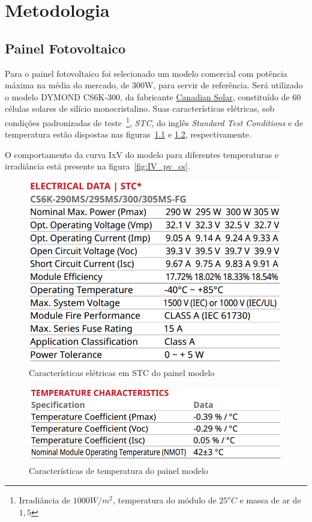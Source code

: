 \documentclass[
	12pt,				%
	openright,			%
	onseside,
	a4paper,			%
	english,			%
	french,				%
	spanish,			%
	brazil,				%
	]{abntex2}
\begin{document}

\chapter{Metodologia}

\section{Painel Fotovoltaico}

Para o painel fotovoltaico foi selecionado um modelo comercial com potência máxima na média do mercado, de 300W, para servir de referência. Será utilizado o modelo DYMOND CS6K-300, da fabricante \href{https://www.canadiansolar.com/en}{Canadian Solar}, constituído de 60 células solares de silício monocristalino. Suas características elétricas, sob condições padronizadas de teste~\footnote{Irradiância de $1000W/m^2$, temperatura do módulo de $25^oC$ e massa de ar de $1,5$}, \emph{STC}, do inglês \textit{Standard Test Conditions} e de temperatura estão dispostas nas figuras~\ref{fig:pv_elet} e \ref{fig:pv_temp}, respectivamente.

O comportamento da curva IxV do modelo para diferentes temperaturas e irradiância está presente na figura~\ref{fig:IV_pv_cs}. 
\begin{figure}[htbp]%
	\begin{center}%
		\includegraphics[width=0.55 \linewidth]{elet_canadian_300}
		\caption{Características elétricas em STC do painel modelo \cite{Canadian_Datasheet}}
		\label{fig:pv_elet}
	\end{center}
\end{figure}

\begin{figure}[htbp]%
	\begin{center}%
		\includegraphics[width=0.55 \linewidth]{temp_canad_300}
		\caption{Características de temperatura do painel modelo \cite{Canadian_Datasheet}}
		\label{fig:pv_temp}
	\end{center}
\end{figure}
\end{document}
